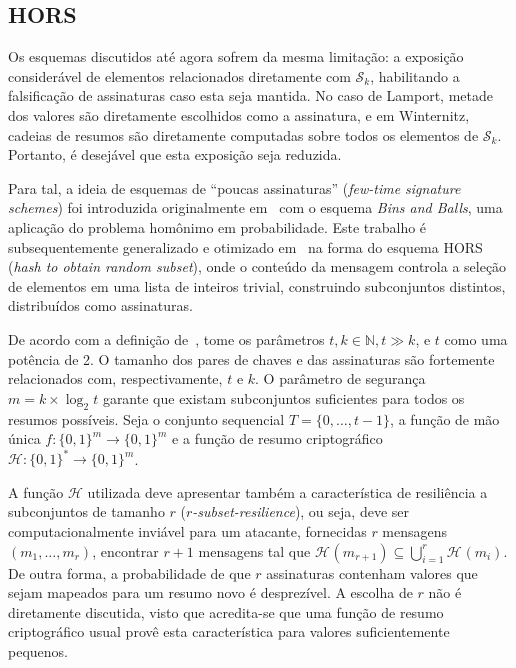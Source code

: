 \documentclass[12pt]{report}
\newcommand{\hh}{\mathcal{H}}
\newcommand{\sk}{\mathcal{S}_k}
\newcommand{\hash}[2][]{\mathcal{H}^{#1}(#2)}
\newcommand{\binwds}[1]{\{0, 1\}^{#1}}
\newcommand{\fhash}[1]{\hh{} : \binwds{*} \longrightarrow \binwds{#1}}
\begin{document}
\subsection{HORS}

Os esquemas discutidos até agora sofrem da mesma limitação: a exposição
considerável de elementos relacionados diretamente com $\sk{}$, habilitando
a falsificação de assinaturas caso esta seja mantida. No caso de Lamport, metade
dos valores são diretamente escolhidos como a assinatura, e em Winternitz,
cadeias de resumos são diretamente computadas sobre todos os elementos de $\sk{}$. Portanto,
é desejável que esta exposição seja reduzida.

Para tal, a ideia de esquemas de ``poucas assinaturas'' (\emph{few-time signature
schemes}) foi introduzida originalmente em~\cite{Perrig:2001:BOS:501983.501988}
com o esquema \emph{Bins and Balls}, uma aplicação do problema homônimo em
probabilidade. Este trabalho é subsequentemente generalizado e otimizado
em~\cite{Reyzin:2002:BBS:646039.678322} na forma do esquema HORS
(\emph{hash to obtain random subset}), onde o conteúdo da mensagem controla a
seleção de elementos em uma lista de inteiros trivial, construindo subconjuntos
distintos, distribuídos como assinaturas.

De acordo com a definição de~\cite{Reyzin:2002:BBS:646039.678322}, tome
os parâmetros $t, k \in \mathbb{N}, t \gg k$, e $t$ como uma potência de 2.
O tamanho dos pares de chaves e das assinaturas são fortemente relacionados
com, respectivamente, $t$ e $k$. O parâmetro de segurança
$m = k \times \log_2 t$ garante que existam subconjuntos suficientes para
todos os resumos possíveis. Seja o conjunto sequencial $T = \{0, \dots, t - 1\}$, a função de mão única $f : \binwds{m} \longrightarrow \binwds{m}$ e a função de resumo criptográfico $\fhash{m}$.

A função $\hh{}$ utilizada deve apresentar também a característica de
resiliência a subconjuntos de tamanho $r$ (\emph{$r$-subset-resilience}), ou seja, deve ser computacionalmente inviável
para um atacante, fornecidas $r$ mensagens $(m_1, \dots, m_r)$, encontrar
$r + 1$ mensagens tal que $\hash{m_{r + 1}} \subseteq \bigcup^{r}_{i = 1} \hash{m_i}$. De outra forma, a probabilidade de que $r$ assinaturas contenham valores que sejam mapeados para um resumo novo é desprezível.
A escolha de $r$ não é diretamente discutida, visto que acredita-se que uma função de resumo criptográfico usual provê esta característica para valores suficientemente pequenos.
\end{document}
